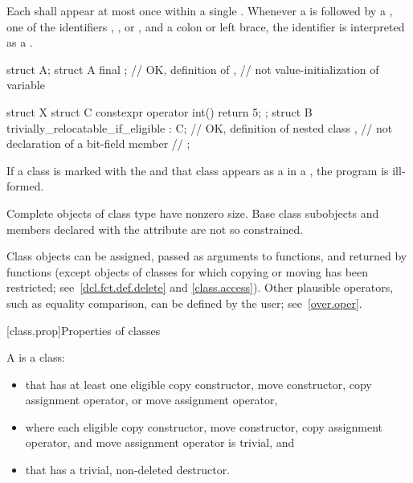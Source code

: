 \pnum
Each  shall appear at most once
within a single .
Whenever a  is followed
by a ,
one of the identifiers , ,
or , and a colon or left brace,
the identifier is interpreted as a .
\begin{example}
\begin{codeblock}
struct A;
struct A final {};      // OK, definition of ,
                        // not value-initialization of variable 

struct X {
 struct C { constexpr operator int() { return 5; } };
 struct B trivially_relocatable_if_eligible : C{};
                        // OK, definition of nested class ,
                        // not declaration of a bit-field member
                        // 
};
\end{codeblock}
\end{example}

\pnum
If a class is marked with the 
 and that class appears as a 
in a , the program is ill-formed.

\pnum
\begin{note}
Complete objects of class type have nonzero size.
Base class subobjects and
members declared with the  attribute
are not so constrained.
\end{note}

\pnum
\begin{note}
Class objects can be assigned,
passed as arguments to functions, and
returned by functions (except objects of classes for which copying or moving has
been restricted; see~\ref{dcl.fct.def.delete} and \ref{class.access}).
Other plausible operators, such as equality comparison,
can be defined by the user; see~\ref{over.oper}.
\end{note}

[class.prop]{Properties of classes}

\pnum
A  is a class:
\begin{itemize}
\item that has at least one eligible
copy constructor, move constructor,
copy assignment operator, or
move assignment operator,
\item where each eligible copy constructor, move constructor, copy assignment operator,
and move assignment operator is trivial, and
\item that has a trivial, non-deleted destructor.
\end{itemize}

